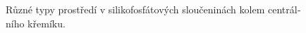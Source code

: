 \documentclass[
  printed, %
  table,   %
  lof,     %
  lot,     %
  oneside,
]{fithesis3}
\begin{document}
\begin{otherlanguage}{czech}
\begin{figure}
\begin{center}
\end{center}\caption{Různé typy prostředí v silikofosfátových sloučeninách kolem centrálního křemíku.}
\end{figure}
\end{otherlanguage}
\end{document}
